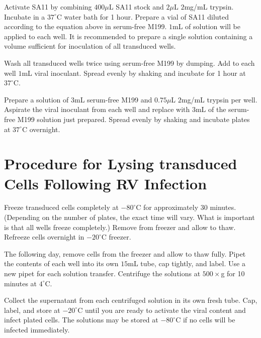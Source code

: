 Activate SA11 by combining $400\mu$L SA11 stock and $2\mu$L $2$mg/mL trypsin. Incubate in a $37^{\circ}$C water bath for 1 hour. Prepare a vial of SA11 diluted according to the equation above in serum-free M199. $1$mL of solution will be applied to each well. It is recommended to prepare a single solution containing a volume sufficient for inoculation of all transduced wells.

Wash all transduced wells twice using serum-free M199 by dumping. Add to each well $1$mL viral inoculant. Spread evenly by shaking and incubate for 1 hour at $37^{\circ}$C.

Prepare a solution of $3$mL serum-free M199 and $0.75\mu$L $2$mg/mL trypsin per well. Aspirate the viral inoculant from each well and replace with $3$mL of the serum-free M199 solution just prepared. Spread evenly by shaking and incubate plates at $37^{\circ}$C overnight.

\section{Procedure for Lysing transduced Cells Following RV Infection}

Freeze transduced cells completely at $-80^{\circ}$C for approximately 30 minutes.  (Depending on the number of plates, the exact time will vary. What is important is that all wells freeze completely.) Remove from freezer and allow to thaw. Refreeze cells overnight in $-20^{\circ}$C freezer.

The following day, remove cells from the freezer and allow to thaw fully. Pipet the contents of each well into its own $15$mL tube, cap tightly, and label. Use a new pipet for each solution transfer. Centrifuge the solutions at $500\times$g for 10 minutes at $4^{\circ}$C.

Collect the supernatant from each centrifuged solution in its own fresh tube. Cap, label, and store at $-20^{\circ}$C until you are ready to activate the viral content and infect plated cells. The solutions may be stored at $-80^{\circ}$C if no cells will be infected immediately.